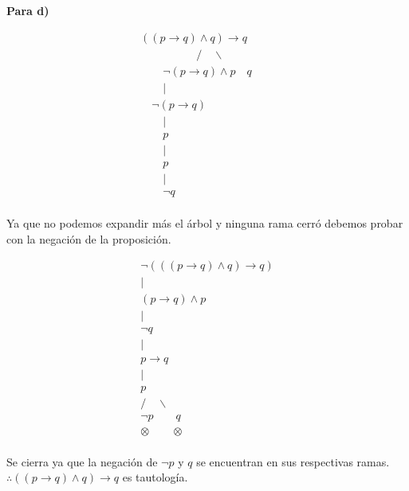 \textbf{Para d)}
\begin{center}
\[
\begin{array}{c}
((p \rightarrow q)\land q) \rightarrow q\\
\quad \quad \quad \quad \quad  / \quad \backslash \\
\quad \quad \neg(p\rightarrow q)\land p \quad q \quad \quad \\
\quad \quad  | \\
\quad \neg (p \rightarrow q) \\
\quad \quad |\\
\quad \quad p \\
\quad \quad | \\
\quad \quad p \\
\quad \quad | \\
\quad \quad \neg q \\
\end{array}
\]
\end{center}
Ya que no podemos expandir más el árbol y ninguna rama cerró debemos probar con la negación de la proposición.
\begin{center}
\[
\begin{array}{c}
\neg(((p \rightarrow q)\land q) \rightarrow q)\\
| \\
(p \rightarrow q) \land p \\
|\\
\neg q \\
|\\
p \rightarrow q \\
| \\
p \\
/ \quad \backslash \\
\neg p \quad \quad q \\
\otimes \quad \quad \otimes \\
\end{array}
\]
\end{center}
Se cierra ya que la negación de $\neg p$ y $q$ se encuentran en sus respectivas ramas.\\
$\therefore ((p \rightarrow q)\land q) \rightarrow q$ es tautología.\\
\newline

